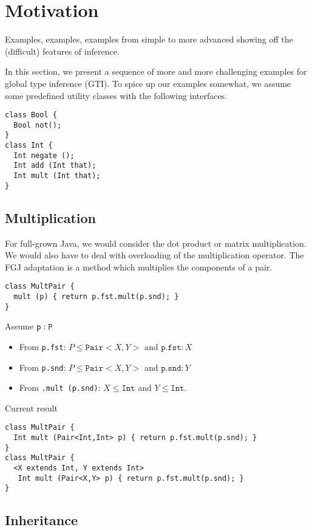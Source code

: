 \section{Motivation}
\label{sec:motivation}

Examples, examples, examples from simple to more advanced showing off
the (difficult) features of inference.

In this section, we present a sequence of more and more challenging
examples for global type inference (GTI). To spice up our examples
somewhat, we assume some predefined utility classes with the following
interfaces.
\begin{lstlisting}
class Bool {
  Bool not(); 
}
class Int {
  Int negate ();
  Int add (Int that);
  Int mult (Int that);
}
\end{lstlisting}

\subsection{Multiplication}
\label{sec:multiplication}

For full-grown Java, we would consider the dot product or matrix
multiplication. We would also have to deal with overloading of the
multiplication operator. The FGJ adaptation is a method which multiplies the
components of a pair.
\begin{lstlisting}
class MultPair {
  mult (p) { return p.fst.mult(p.snd); }
}
\end{lstlisting}
Assume $\tt p:P$
\begin{itemize}
\item From \texttt{p.fst}: $P \le \mathtt{Pair}<X,Y>$ and
  $\texttt{p.fst} : X$
\item From \texttt{p.snd}: $P \le \mathtt{Pair}<X,Y>$ and
  $\texttt{p.snd} : Y$
\item From \texttt{.mult (p.snd)}: $X \le \mathtt{Int}$ and $Y \le \mathtt{Int}$.
\end{itemize}
Current result
\begin{lstlisting}
class MultPair {
  Int mult (Pair<Int,Int> p) { return p.fst.mult(p.snd); }
}
class MultPair {
  <X extends Int, Y extends Int>
   Int mult (Pair<X,Y> p) { return p.fst.mult(p.snd); }
}
\end{lstlisting}

\subsection{Inheritance}
\label{sec:inheritance}

